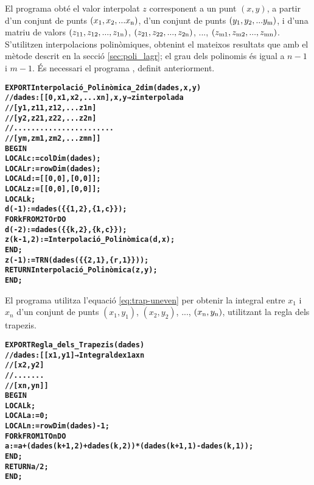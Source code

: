El programa  obté el valor interpolat $z$ corresponent a un punt $(x, y)$, a partir d'un conjunt de punts $(x_\mathrm{1}, x_\mathrm{2}, ... x_\mathrm{n})$, d'un conjunt de punts $(y_\mathrm{1}, y_\mathrm{2}, ... y_\mathrm{m})$, i d'una matriu de valors $(z_\mathrm{11}, z_\mathrm{12}, ..., z_\mathrm{1n})$,
$(z_\mathrm{21}, z_\mathrm{22}, ..., z_\mathrm{2n})$, ..., $(z_\mathrm{m1}, z_\mathrm{m2}, ..., z_\mathrm{mn})$. S'utilitzen  interpolacions polinòmiques, obtenint el mateixos resultats que amb el mètode descrit en la secció \vref{sec:poli_lagr}; el grau dels polinomis és igual a $n-1$ i $m-1$.
És necessari el programa , definit anteriorment.
\vspace{-1cm}
\begin{alltt}
\bfseries
{}
    EXPORT Interpolació_Polinòmica_2dim(dades,x,y)
    // dades:[[0,   x1,  x2, ...  xn], x, y → z interpolada
    //        [y1, z11, z12, ... z1n]
    //        [y2, z21, z22, ... z2n]
    //        .......................
    //        [ym, zm1, zm2, ... zmn]]
    BEGIN
      LOCAL c:=colDim(dades);
      LOCAL r:=rowDim(dades);
      LOCAL d:=[[0,0],[0,0]];
      LOCAL z:=[[0,0],[0,0]];
      LOCAL k;
      d(-1):=dades(\{\{1,2\},\{1,c\}\});
      FOR k FROM 2 TO r DO
        d(-2):=dades(\{\{k,2\},\{k,c\}\});
        z(k-1,2):=Interpolació_Polinòmica(d,x);
      END;
      z(-1):=TRN(dades(\{\{2,1\},\{r,1\}\}));
      RETURN Interpolació_Polinòmica(z,y);
    END;
\end{alltt}

El programa  utilitza l'equació  \eqref{eq:trap-uneven} per obtenir la integral entre $x_1$ i $x_n$ d'un conjunt  de punts $(x_1,y_1)$, $(x_2,y_2)$, ..., $(x_\mathrm{n},y_\mathrm{n})$, utilitzant la regla dels trapezis.
\vspace{-1cm}
\begin{alltt}
\bfseries
{}
    EXPORT Regla_dels_Trapezis(dades)
    // dades:[[x1,y1] → Integral de x1 a xn
    //        [x2,y2]
    //        .......
    //        [xn,yn]]
    BEGIN
      LOCAL k;
      LOCAL a:=0;
      LOCAL n:=rowDim(dades)-1;
      FOR k FROM 1 TO n DO
        a:=a+(dades(k+1,2)+dades(k,2))*(dades(k+1,1)-dades(k,1));
      END;
      RETURN a/2;
    END;
\end{alltt}

